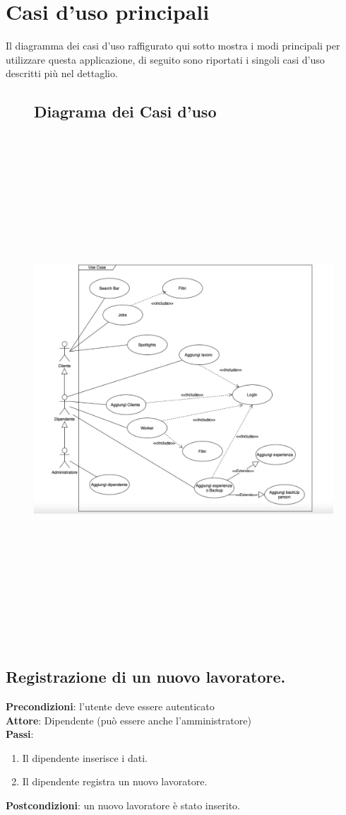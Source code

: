 \documentclass[ 4paper,11pt,openany]{book}
\begin{document}
	
\section{Casi d'uso principali}
Il diagramma dei casi d'uso raffigurato qui sotto mostra i modi principali per utilizzare questa applicazione, di seguito sono riportati i singoli casi d'uso descritti più nel dettaglio.
\begin{figure}[htpb!] 
	\subsection{Diagrama dei Casi d'uso}
	\includegraphics[height=190mm,width=180mm]{UseCase.jpeg}
\end{figure}
	
	
\subsection{Registrazione di un nuovo lavoratore.}
\textbf{Precondizioni}: l'utente deve essere autenticato\\
\textbf{Attore}: Dipendente (può essere anche l'amministratore)\\
\textbf{Passi}:
\begin{enumerate}
	\item Il dipendente inserisce i dati.
	\item Il dipendente registra un nuovo lavoratore.
\end{enumerate}
\textbf{Postcondizioni}: un nuovo lavoratore è stato inserito.
	
\end{document}
